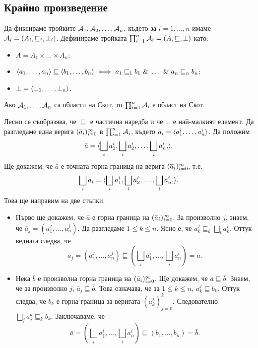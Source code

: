 \subsection{Крайно произведение}
\label{subsect:domains:product}

Да фиксираме тройките $\mathcal{A}_1,\mathcal{A}_2,\dots,\mathcal{A}_n$, където за $i = 1,\dots,n$ имаме
$\mathcal{A}_i = (A_i, \sqsubseteq_i, \bot_i)$. Дефинираме тройката 
$\prod^n_{i=1}\mathcal{A}_i = (A, \sqsubseteq, \bot)$ като:
\begin{itemize}
\item
  $A = A_1\times\dots\times A_n$;
\item 
  $\pair{a_1,\dots,a_n} \sqsubseteq \pair{b_1,\dots,b_n} \iff a_1 \sqsubseteq_1 b_1\ \&\ \dots\ \&\ a_n \sqsubseteq_n b_n$;
\item
  $\bot = \langle{\bot_1,\dots,\bot_n}\rangle$.
\end{itemize}

\begin{prop}
  \label{pr:cartesian}
  Ако $\mathcal{A}_1,\dots,\mathcal{A}_n$ са области на Скот, то $\prod^n_{i=1}\mathcal{A}_i$ е област на Скот.
\end{prop}
\begin{hint}
  Лесно се съобразява, че $\sqsubseteq$ е частична наредба и че $\bot$ е най-малкият елемент.
  Да разгледаме една верига $(\overline{a}_{i})^{\infty}_{i=0}$ в $\prod^n_{i=1}\mathcal{A}_i$,
  където $\bar{a}_i = \langle{a^i_1,\dots,a^i_n}\rangle$.
  Да положим \[\bar{a} = \langle{\bigsqcup_i a^i_1,\bigsqcup_i a^i_2,\ldots,\bigsqcup_i a^i_n,}\rangle.\]
  Ще докажем, че $\bar{a}$ е точната горна граница на верига $(\overline{a}_{i})^{\infty}_{i=0}$, т.е.
  \[\bigsqcup_i\bar{a}_i = \langle{\bigsqcup_i a^i_1,\bigsqcup_i a^i_2,\ldots,\bigsqcup_i a^i_n,}\rangle.\]
  Това ще направим на две стъпки.
  \begin{itemize}
  \item 
    Първо ще докажем, че $\bar{a}$ е горна граница на $(\bar{a}_{i})^{\infty}_{i=0}$.
    За произволно $j$, знаем, че $\bar{a}_j = (a^j_1,\dots,a^j_n)$.
    Да разгледаме $1 \leq k \leq n$.
    Ясно е, че $a^j_k \sqsubseteq_k \bigsqcup_i a^i_k$.
    Оттук веднага следва, че
    \[\bar{a}_j = (a^j_1,\dots,a^j_n) \sqsubseteq (\bigsqcup_i a^i_1,\dots,\bigsqcup_i a^i_n) = \bar{a}.\]
  \item
    Нека $\bar{b}$ е произволна горна граница на $(\bar{a}_{i})^{\infty}_{i=0}$.
    Ще докажем, че $\bar{a} \sqsubseteq \bar{b}$.
    Знаем, че за произволно $j$, $\bar{a}_j \sqsubseteq \bar{b}$.
    Това означава, че за $1 \leq k \leq n$,
    $a^j_k \sqsubseteq b_k$. 
    Оттук следва, че $b_k$ е горна граница за веригата $(a^j_k)^k_{j=0}$.
    Следователно $\bigsqcup_j a^k_j \sqsubseteq_k b_k$.
    Заключаваме, че
    \[\bar{a} = (\bigsqcup_i a^i_1,\dots,\bigsqcup_i a^i_n) \sqsubseteq (b_1,\dots,b_n) = \bar{b}.\]
  \end{itemize}
\end{hint}

